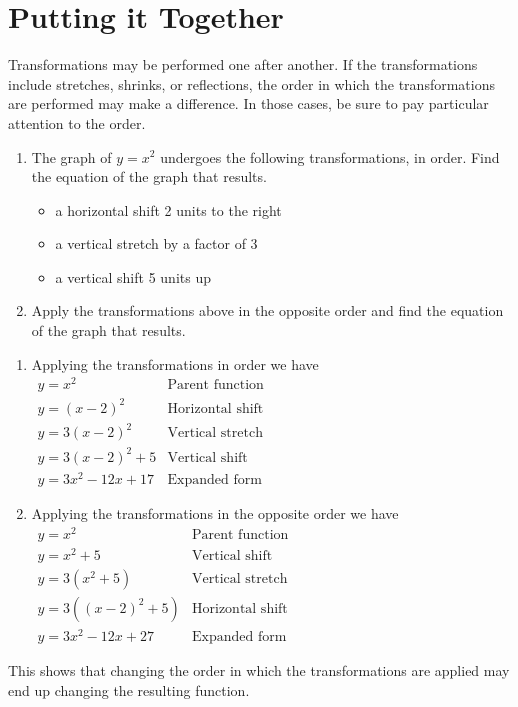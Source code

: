 \documentclass[handout, noauthor, nooutcomes]{ximera}
\begin{document}
\section{Putting it Together}
Transformations may be performed one after another. If the transformations include stretches, shrinks, or reflections, the order in which the transformations are performed may make a difference. In those cases, be sure to pay particular attention to the order.

\begin{example}
\begin{enumerate}
\item The graph of $y=x^2$ undergoes the following transformations, in order. Find the equation of the graph that results.
\begin{itemize}
\item a horizontal shift 2 units to the right
\item a vertical stretch by a factor of 3
\item a vertical shift 5 units up
\end{itemize}
\item Apply the transformations above in the opposite order and find the equation of the graph that results.
\end{enumerate}
\begin{explanation}
\begin{enumerate}
\item Applying the transformations in order we have\\
$
\begin{array}{lc}
y = x^2& \text{Parent function}\\
y = (x-2)^2& \text{Horizontal shift} \\
y = 3(x-2)^2& \text{Vertical stretch} \\
y = 3(x-2)^2+5& \text{Vertical shift}\\
y = 3x^2 - 12x + 17& \text{Expanded form}
\end{array}
$
\item Applying the transformations in the opposite order we have\\
$
\begin{array}{lc}
y = x^2& \text{Parent function}\\
y = x^2 + 5 & \text{Vertical shift} \\
y = 3(x^2+5)& \text{Vertical stretch} \\
y = 3((x-2)^2+5) & \text{Horizontal shift}\\
y = 3x^2 - 12x + 27& \text{Expanded form}
\end{array}
$
\end{enumerate}
This shows that changing the order in which the transformations are applied may end up changing the resulting function. 
\end{explanation}
\end{example}
\end{document}
